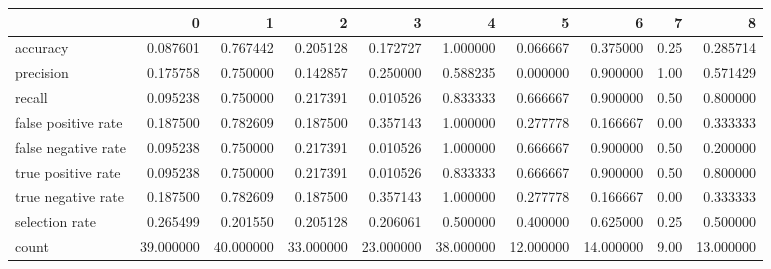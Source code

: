 \begin{tabular}{lrrrrrrrrr}
\toprule
{} &          0 &          1 &          2 &          3 &          4 &          5 &          6 &     7 &          8 \\
\midrule
accuracy            &   0.087601 &   0.767442 &   0.205128 &   0.172727 &   1.000000 &   0.066667 &   0.375000 &  0.25 &   0.285714 \\
precision           &   0.175758 &   0.750000 &   0.142857 &   0.250000 &   0.588235 &   0.000000 &   0.900000 &  1.00 &   0.571429 \\
recall              &   0.095238 &   0.750000 &   0.217391 &   0.010526 &   0.833333 &   0.666667 &   0.900000 &  0.50 &   0.800000 \\
false positive rate &   0.187500 &   0.782609 &   0.187500 &   0.357143 &   1.000000 &   0.277778 &   0.166667 &  0.00 &   0.333333 \\
false negative rate &   0.095238 &   0.750000 &   0.217391 &   0.010526 &   1.000000 &   0.666667 &   0.900000 &  0.50 &   0.200000 \\
true positive rate  &   0.095238 &   0.750000 &   0.217391 &   0.010526 &   0.833333 &   0.666667 &   0.900000 &  0.50 &   0.800000 \\
true negative rate  &   0.187500 &   0.782609 &   0.187500 &   0.357143 &   1.000000 &   0.277778 &   0.166667 &  0.00 &   0.333333 \\
selection rate      &   0.265499 &   0.201550 &   0.205128 &   0.206061 &   0.500000 &   0.400000 &   0.625000 &  0.25 &   0.500000 \\
count               &  39.000000 &  40.000000 &  33.000000 &  23.000000 &  38.000000 &  12.000000 &  14.000000 &  9.00 &  13.000000 \\
\bottomrule
\end{tabular}
